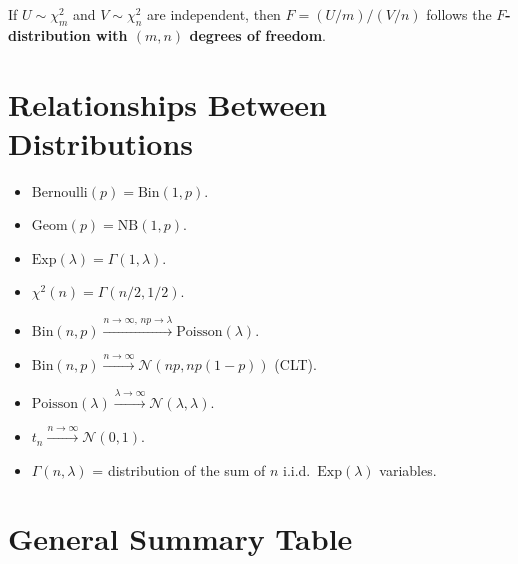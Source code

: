\begin{definition}[Fisher's $F$]
If $U \sim \chi^2_m$ and $V \sim \chi^2_n$ are independent, then
$F = (U/m)/(V/n)$ follows the \textbf{$F$-distribution with $(m, n)$ degrees
of freedom}.
\end{definition}

\section{Relationships Between Distributions}

\begin{keyformulas}[title=\textbf{Map of distribution relationships}]
\begin{itemize}
    \item $\mathrm{Bernoulli}(p) = \mathrm{Bin}(1, p)$.
    \item $\mathrm{Geom}(p) = \mathrm{NB}(1, p)$.
    \item $\mathrm{Exp}(\lambda) = \Gamma(1, \lambda)$.
    \item $\chi^2(n) = \Gamma(n/2, 1/2)$.
    \item $\mathrm{Bin}(n,p) \xrightarrow{n\to\infty,\,np\to\lambda} \mathrm{Poisson}(\lambda)$.
    \item $\mathrm{Bin}(n,p) \xrightarrow{n\to\infty} \mathcal{N}(np, np(1-p))$ \quad (CLT).
    \item $\mathrm{Poisson}(\lambda) \xrightarrow{\lambda\to\infty} \mathcal{N}(\lambda, \lambda)$.
    \item $t_n \xrightarrow{n\to\infty} \mathcal{N}(0,1)$.
    \item $\Gamma(n,\lambda)$ = distribution of the sum of $n$ i.i.d.\ $\mathrm{Exp}(\lambda)$ variables.
\end{itemize}
\end{keyformulas}

\section{General Summary Table}

